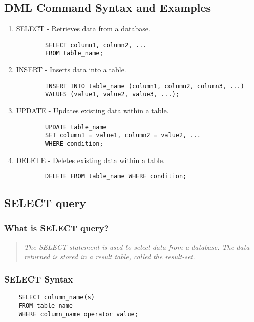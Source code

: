 \documentclass[11pt]{article}
\begin{document}
\subsection{DML Command Syntax and Examples}

\begin{enumerate}
	\item SELECT - Retrieves data from a database.
	      \begin{verbatim}
		SELECT column1, column2, ...
		FROM table_name;
	\end{verbatim}
	\item INSERT - Inserts data into a table.
	      \begin{verbatim}
		INSERT INTO table_name (column1, column2, column3, ...)
		VALUES (value1, value2, value3, ...);
	\end{verbatim}
	\item UPDATE - Updates existing data within a table.
	      \begin{verbatim}
		UPDATE table_name
		SET column1 = value1, column2 = value2, ...
		WHERE condition;
	\end{verbatim}
	\item DELETE - Deletes existing data within a table.
	      \begin{verbatim}
		DELETE FROM table_name WHERE condition;
	\end{verbatim}
\end{enumerate}

\subsection{SELECT query}
\subsubsection{What is SELECT query?}
\begin{quote}
	\textit{The SELECT statement is used to select data from a database. The data returned is stored in a result table, called the result-set.}
\end{quote}

\subsubsection{SELECT Syntax}

\begin{verbatim}
	SELECT column_name(s)
	FROM table_name
	WHERE column_name operator value;
\end{verbatim}
\end{document}
